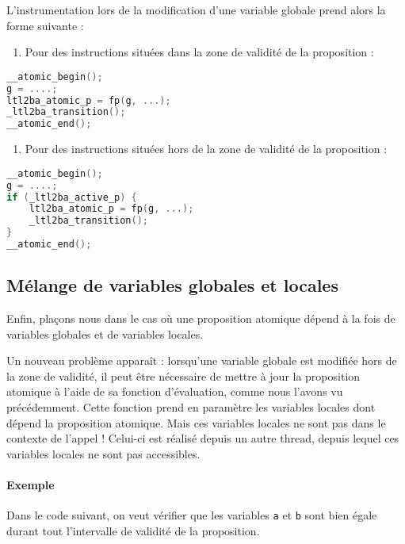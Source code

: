 L'instrumentation lors de la modification d'une variable globale prend
alors la forme suivante :

\begin{enumerate}
\def\labelenumi{\arabic{enumi})}
\item
  Pour des instructions situées dans la zone de validité de la
  proposition :
\end{enumerate}

\begin{lstlisting}[language=C, frame=single, caption=Instrumentation pour une
  variable globale dans la zone de validité]
__atomic_begin();
g = ....;
ltl2ba_atomic_p = fp(g, ...);
_ltl2ba_transition();
__atomic_end();
\end{lstlisting}

\begin{enumerate}
\def\labelenumi{\arabic{enumi})}
\setcounter{enumi}{1}
\item
  Pour des instructions situées hors de la zone de validité de la
  proposition :
\end{enumerate}

\begin{lstlisting}[language=C, frame=single, caption=Instrumentation pour une
  variable globale hors de la zone de validité]
__atomic_begin();
g = ....;
if (_ltl2ba_active_p) {
    ltl2ba_atomic_p = fp(g, ...);
    _ltl2ba_transition();
}
__atomic_end();
\end{lstlisting}

\subsection{Mélange de variables globales et locales}

Enfin, plaçons nous dans le cas où une proposition atomique dépend à la
fois de variables globales et de variables locales.

Un nouveau problème apparaît : lorsqu'une variable globale est modifiée
hors de la zone de validité, il peut être nécessaire de mettre à jour la
proposition atomique à l'aide de sa fonction d'évaluation, comme nous
l'avons vu précédemment. Cette fonction prend en paramètre les variables
locales dont dépend la proposition atomique. Mais ces variables locales
ne sont pas dans le contexte de l'appel ! Celui-ci est réalisé depuis un
autre thread, depuis lequel ces variables locales ne sont pas
accessibles.

\paragraph{Exemple}
Dans le code suivant, on veut vérifier que les variables \texttt{a} et
\texttt{b} sont bien égale durant tout l'intervalle de validité de la
proposition.

